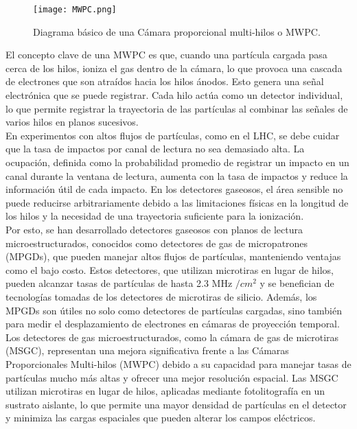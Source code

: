 \documentclass{article}
\begin{document}
\begin{figure}[H]
    \centering
    \texttt{[image: MWPC.png]}
    \caption{Diagrama básico de una Cámara proporcional multi-hilos o MWPC.}
    \label{fig:MWPC}
\end{figure}


\noindent El concepto clave de una MWPC es que, cuando una partícula cargada pasa cerca de los hilos, ioniza el gas dentro de la cámara, lo que provoca una cascada de electrones que son atraídos hacia los hilos ánodos. Esto genera una señal electrónica que se puede registrar. Cada hilo actúa como un detector individual, lo que permite registrar la trayectoria de las partículas al combinar las señales de varios hilos en planos sucesivos.\\

\noindent En experimentos con altos flujos de partículas, como en el LHC, se debe cuidar que la tasa de impactos por canal de lectura no sea demasiado alta. La ocupación, definida como la probabilidad promedio de registrar un impacto en un canal durante la ventana de lectura, aumenta con la tasa de impactos y reduce la información útil de cada impacto. En los detectores gaseosos, el área sensible no puede reducirse arbitrariamente debido a las limitaciones físicas en la longitud de los hilos y la necesidad de una trayectoria suficiente para la ionización.\\

\noindent Por esto, se han desarrollado detectores gaseosos con planos de lectura microestructurados, conocidos como detectores de gas de micropatrones (MPGDs), que pueden manejar altos flujos de partículas, manteniendo ventajas como el bajo costo. Estos detectores, que utilizan microtiras en lugar de hilos, pueden alcanzar tasas de partículas de hasta 2.3 MHz $/cm^{2}$ y se benefician de tecnologías tomadas de los detectores de microtiras de silicio. Además, los MPGDs son útiles no solo como detectores de partículas cargadas, sino también para medir el desplazamiento de electrones en cámaras de proyección temporal.\\

\noindent Los detectores de gas microestructurados, como la cámara de gas de microtiras (MSGC), representan una mejora significativa frente a las Cámaras Proporcionales Multi-hilos (MWPC) debido a su capacidad para manejar tasas de partículas mucho más altas y ofrecer una mejor resolución espacial. Las MSGC utilizan microtiras en lugar de hilos, aplicadas mediante fotolitografía en un sustrato aislante, lo que permite una mayor densidad de partículas en el detector y minimiza las cargas espaciales que pueden alterar los campos eléctricos.\\
\end{document}
